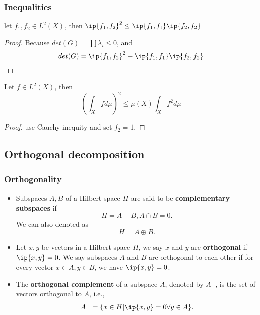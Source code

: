 \begin{refsection}
\subsubsection{Inequalities}
\begin{lemma}
	let $f_1,f_2 \in L^2(X)$, then $\ip{f_1,f_2}^2 \leq \ip{f_1,f_1}\ip{f_2,f_2}$ 
\end{lemma}
\begin{proof}
	Because $det(G) = \prod \lambda_i \leq 0$, and
	$$det(G) = \ip{f_1,f_2}^2 - \ip{f_1,f_1}\ip{f_2,f_2}$$	
\end{proof}



\begin{corollary}
	\cite[5]{sansone2004orthogonal} Let $f\in L^2(X)$, then
	$$(\int_X f d\mu)^2 \leq \mu(X) \int_X f^2 d\mu$$
\end{corollary}
\begin{proof}
	use Cauchy inequity and set $f_2 = 1$.	
\end{proof}



\subsection{Orthogonal decomposition}

\subsubsection{Orthogonality}
\begin{definition}
\cite[392]{meyer2000matrix}\cite[108]{moon2000mathematical}\cite[403]{meyer2000matrix}
\begin{itemize}
	\item Subspaces $A,B$ of a Hilbert space $H$ are said to be \textbf{complementary subspaces} if
	$$H = A + B, A\cap B = 0.$$
	We can also denoted as
	$$H = A \oplus B.$$
	\item Let $x,y$ be vectors in a Hilbert space $H$, we say $x$ and $y$ are \textbf{orthogonal} if $\ip{x,y} = 0$. We say subspaces $A$ and $B$  are orthogonal to each other if for every vector $x\in A,y\in B$, we have $\ip{x,y} = 0$.
	\item 	The \textbf{orthogonal complement} of a subspace $A$, denoted by $A^\perp$, is the set of vectors orthogonal to $A$, i.e.,
	$$A^\perp = \{x\in H| \ip{x,y} = 0 \forall y\in A\}.$$
\end{itemize}
\end{definition}


\end{refsection}
